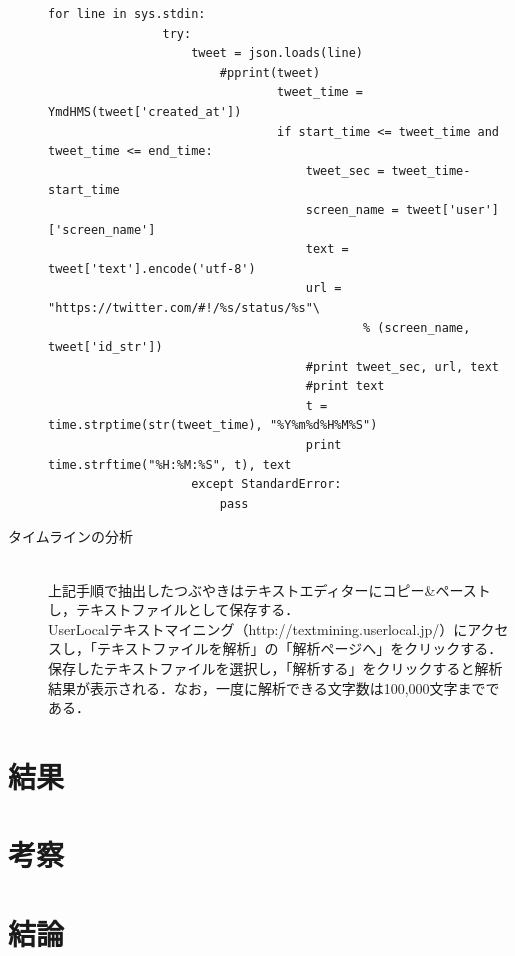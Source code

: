 \begin{description}
\begin{lstlisting}[caption={}, label={}]
			for line in sys.stdin:
				try:
					tweet = json.loads(line)
        				#pprint(tweet)
            					tweet_time = YmdHMS(tweet['created_at'])
            					if start_time <= tweet_time and tweet_time <= end_time:
                					tweet_sec = tweet_time-start_time
                					screen_name = tweet['user']['screen_name']
                					text = tweet['text'].encode('utf-8')
                					url = "https://twitter.com/#!/%s/status/%s"\
                    						% (screen_name, tweet['id_str'])
                					#print tweet_sec, url, text
                					#print text
                					t = time.strptime(str(tweet_time), "%Y%m%d%H%M%S")
                					print time.strftime("%H:%M:%S", t), text
    				except StandardError:
        				pass
		\end{lstlisting}
 \item[タイムラインの分析]\mbox{}\\
	上記手順で抽出したつぶやきはテキストエディターにコピー\&ペーストし，テキストファイルとして保存する．\\
	UserLocalテキストマイニング（http://textmining.userlocal.jp/）にアクセスし，「テキストファイルを解析」の「解析ページへ」をクリックする．\\
	保存したテキストファイルを選択し，「解析する」をクリックすると解析結果が表示される．なお，一度に解析できる文字数は100,000文字までである．
	
\end{description}
		
\chapter{結果}

\chapter{考察}

\chapter{結論}



